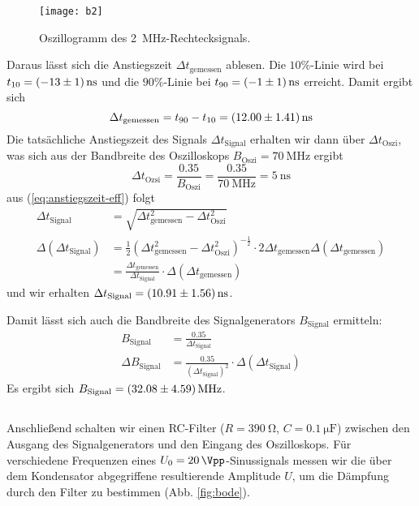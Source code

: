 \documentclass{article}
\newcommand{\mr}{\mathrm}
\begin{document}
\begin{figure}
    \centering
    \texttt{[image: b2]}
    \caption{Oszillogramm des \SI{2}{\MHz}-Rechtecksignals.}
    \label{fig:anstiegszeit}
\end{figure}

Daraus lässt sich die Anstiegszeit $\Delta t_\text{gemessen}$ ablesen.
Die $10\%$-Linie wird bei $t_{10}=\SI{-13\pm1}{\ns}$ und die $90\%$-Linie bei $t_{90}=\SI{-1\pm1}{\ns}$ erreicht. Damit ergibt sich
\begin{equation}
    \Delta t_\mr{gemessen} = t_{90}-t_{10} = \SI{12\pm1.41}{\ns}
\end{equation}
Die tatsächliche Anstiegszeit des Signals $\Delta t_\text{Signal}$ erhalten wir dann über $\Delta t_\text{Oszi}$, was sich aus der Bandbreite des Oszilloskops $B_\text{Oszi} = \SI{70}{\mega\hertz}$ ergibt
\begin{equation}
    \Delta t_\text{Ozsi} = \frac{0.35}{B_\text{Oszi}} = \frac{0.35}{\SI{70}{\mega\hertz}} = \SI{5}{\ns}
\end{equation}
aus (\ref{eq:anstiegszeit-eff}) folgt
\begin{align}
    \Delta t_\mr{Signal} &= \sqrt{\Delta t_\mr{gemessen}^2 - \Delta t_\mr{Oszi}^2} \\
    \Delta(\Delta t_\mr{Signal}) &= \frac{1}{2} (\Delta t_\mr{gemessen}^2 - \Delta t_\mr{Oszi}^2)^{-\frac{1}{2}} \cdot 2 \Delta t_\mr{gemessen} \Delta(\Delta t_\mr{gemessen}) \nonumber \\
    &= \frac{\Delta t_\mr{gemessen}}{\Delta t_\mr{Signal}} \cdot \Delta(\Delta t_\mr{gemessen})
\end{align}
und wir erhalten $\Delta t_\mr{Signal} = \SI{10.91\pm1.56}{\ns}$.

Damit lässt sich auch die Bandbreite des Signalgenerators $B_\text{Signal}$ ermitteln:
\begin{align}
    B_\text{Signal} &= \frac{0.35}{\Delta t_\text{Signal}} \\
    \Delta B_\text{Signal} &= \frac{0.35}{(\Delta t_\text{Signal})^2}\cdot \Delta(\Delta t_\text{Signal})
\end{align}
Es ergibt sich $B_\mr{Signal} = \SI{32.08 \pm 4.59}{\MHz}$.


\subsection{}
Anschließend schalten wir einen RC-Filter ($R=\SI{390}{\ohm}$, $C=\SI{0.1}{\micro\farad}$) zwischen den Ausgang des Signalgenerators und den Eingang des Oszilloskops.
Für verschiedene Frequenzen eines $U_0 = \SI{20}{\Vpp}$-Sinussignals messen wir die über dem
Kondensator abgegriffene resultierende Amplitude $U$, um die Dämpfung durch den Filter zu bestimmen (Abb. \ref{fig:bode}).
\end{document}
